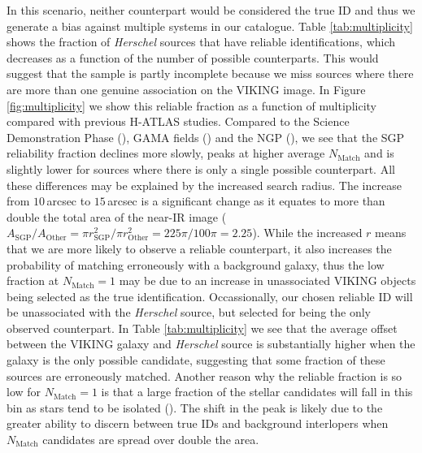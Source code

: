 In this scenario, neither counterpart would be considered the true ID and thus we generate a bias against multiple systems in our catalogue. Table \ref{tab:multiplicity} shows the fraction of \textit{Herschel} sources that have reliable identifications, which decreases as a function of the number of possible counterparts. This would suggest that the sample is partly incomplete because we miss sources where there are more than one genuine association on the VIKING image. In Figure \ref{fig:multiplicity} we show this reliable fraction as a function of multiplicity compared with previous H-ATLAS studies. Compared to the Science Demonstration Phase (\citealt{Fleuren_2012}), GAMA fields (\citealt{Bourne_2016}) and the NGP (\citealt{Furlanetto_2018}), we see that the SGP reliability fraction declines more slowly, peaks at higher average $N_{\textrm{Match}}$ and is slightly lower for sources where there is only a single possible counterpart. All these differences may be explained by the increased search radius. The increase from $10\,$arcsec to $15\,$arcsec is a significant change as it equates to more than double the total area of the near-IR image ($A_{\textrm{SGP}}/A_{\textrm{Other}} = \pi r_{\textrm{SGP}}^2/\pi r_{\textrm{Other}}^2 = 225\pi/100\pi = 2.25$). While the increased $r$ means that we are more likely to observe a reliable counterpart, it also increases the probability of matching erroneously with a background galaxy, thus the low fraction at $N_{\textrm{Match}} = 1$ may be due to an increase in unassociated VIKING objects being selected as the true identification. Occassionally, our chosen reliable ID will be unassociated with the \textit{Herschel} source, but selected for being the only observed counterpart. In Table \ref{tab:multiplicity} we see that the average offset between the VIKING galaxy and \textit{Herschel} source is substantially higher when the galaxy is the only possible candidate, suggesting that some fraction of these sources are erroneously matched. Another reason why the reliable fraction is so low for $N_{\textrm{Match}} = 1$ is that a large fraction of the stellar candidates will fall in this bin as stars tend to be isolated (\citealt{Bourne_2016}). The shift in the peak is likely due to the greater ability to discern between true IDs and background interlopers when $N_{\textrm{Match}}$ candidates are spread over double the area.

